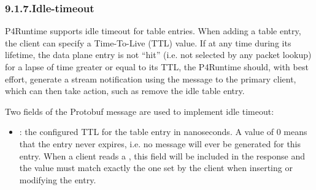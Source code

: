 \documentclass[11pt]{article}
\begin{document}
{%
\subsubsection{9.1.7.\hspace*{0.5em}Idle-timeout}\label{sec-idle-timeout}%

\noindent{}P4Runtime supports idle timeout for table entries. When adding a table entry,
the client can specify a Time-To-Live (TTL) value. If at any time during its
lifetime, the data plane entry is not \textquotedblleft{}hit\textquotedblright{} (i.e. not selected by any packet
lookup) for a lapse of time greater or equal to its TTL, the P4Runtime should,
with best effort, generate a stream notification \textemdash{} using the
 message \textemdash{} to the primary client, which can then take
action, such as remove the idle table entry.%

Two fields of the  Protobuf message are used to implement idle
timeout:%

\begin{itemize}%

\item{}
: the configured TTL for the table entry in nanoseconds. A
value of 0 means that the entry never expires, i.e. no
 message will ever be generated for this entry. When
a client reads a , this field will be included in the response and
the value must match exactly the one set by the client when inserting or
modifying the entry.%


\end{itemize}}
\end{document}

